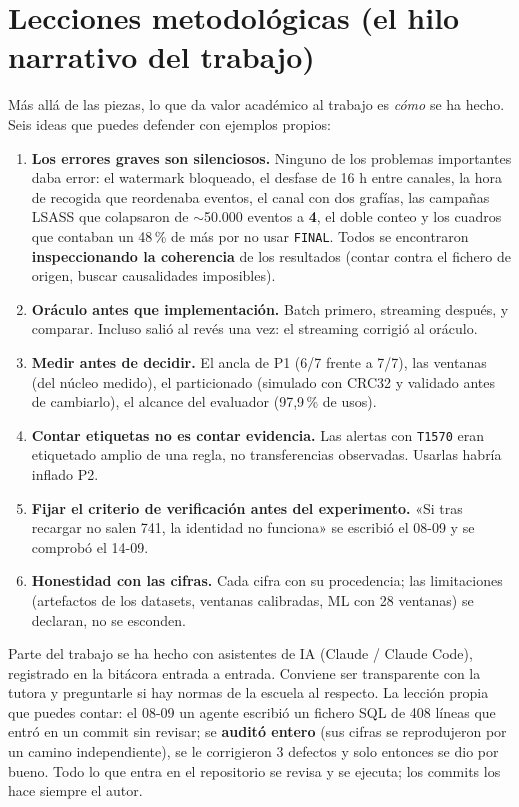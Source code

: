 \documentclass[11pt,a4paper]{article}
\newcommand{\cod}[1]{\texttt{#1}}
\begin{document}
\section{Lecciones metodológicas (el hilo narrativo del trabajo)}\label{sec:lecciones}

Más allá de las piezas, lo que da valor académico al trabajo es \textit{cómo} se ha hecho. Seis ideas que
puedes defender con ejemplos propios:

\begin{enumerate}
  \item \textbf{Los errores graves son silenciosos.} Ninguno de los problemas importantes daba error: el
        watermark bloqueado, el desfase de 16 h entre canales, la hora de recogida que reordenaba eventos, el canal
        con dos grafías, las campañas LSASS que colapsaron de $\sim$50.000 eventos a \textbf{4}, el doble conteo y los
        cuadros que contaban un 48\,\% de más por no usar \cod{FINAL}. Todos se encontraron \textbf{inspeccionando la
        coherencia} de los resultados (contar contra el fichero de origen, buscar causalidades imposibles).
  \item \textbf{Oráculo antes que implementación.} Batch primero, streaming después, y comparar. Incluso salió al
        revés una vez: el streaming corrigió al oráculo.
  \item \textbf{Medir antes de decidir.} El ancla de P1 (6/7 frente a 7/7), las ventanas (del núcleo medido), el
        particionado (simulado con CRC32 y validado antes de cambiarlo), el alcance del evaluador (97,9\,\% de usos).
  \item \textbf{Contar etiquetas no es contar evidencia.} Las alertas con \cod{T1570} eran etiquetado amplio de una
        regla, no transferencias observadas. Usarlas habría inflado P2.
  \item \textbf{Fijar el criterio de verificación antes del experimento.} «Si tras recargar no salen 741, la
        identidad no funciona» se escribió el 08-09 y se comprobó el 14-09.
  \item \textbf{Honestidad con las cifras.} Cada cifra con su procedencia; las limitaciones (artefactos de los
        datasets, ventanas calibradas, ML con 28 ventanas) se declaran, no se esconden.
\end{enumerate}

\begin{resumen}
Parte del trabajo se ha hecho con asistentes de IA (Claude / Claude Code), registrado en la bitácora entrada a
entrada. Conviene ser transparente con la tutora y preguntarle si hay normas de la escuela al respecto. La
lección propia que puedes contar: el 08-09 un agente escribió un fichero SQL de 408 líneas que entró en un commit
sin revisar; se \textbf{auditó entero} (sus cifras se reprodujeron por un camino independiente), se le
corrigieron 3 defectos y solo entonces se dio por bueno. Todo lo que entra en el repositorio se revisa y se
ejecuta; los commits los hace siempre el autor.
\end{resumen}
\end{document}

